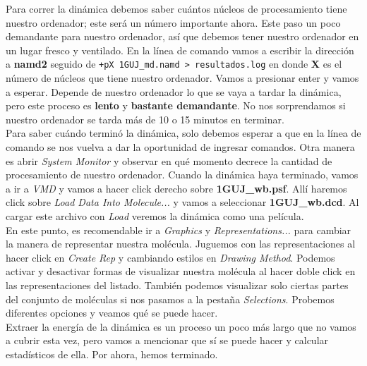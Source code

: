 \documentclass[10pt,letterpaper]{article}
\newcommand{\inlinecode}[1]{
\colorbox{light-gray}{\texttt{#1}}
}
\begin{document}
Para correr la din\'amica debemos saber cu\'antos n\'ucleos de procesamiento tiene nuestro ordenador; este ser\'a un n\'umero importante ahora. Este paso un poco demandante para nuestro ordenador, as\'i que debemos tener nuestro ordenador en un lugar fresco y ventilado. En la l\'inea de comando vamos a escribir la direcci\'on a \textbf{namd2} seguido de \inlinecode{+pX 1GUJ\_md.namd >\ resultados.log} en donde \textbf{X} es el n\'umero de n\'ucleos que tiene nuestro ordenador. Vamos a presionar enter y vamos a esperar. Depende de nuestro ordenador lo que se vaya a tardar la din\'amica, pero este proceso es \textbf{lento} y \textbf{bastante demandante}. No nos sorprendamos si nuestro ordenador se tarda m\'as de 10 o 15 minutos en terminar.\\

Para saber cu\'ando termin\'o la din\'amica, solo debemos esperar a que en la l\'inea de comando se nos vuelva a dar la oportunidad de ingresar comandos. Otra manera es abrir \textit{System Monitor} y observar en qu\'e momento decrece la cantidad de procesamiento de nuestro ordenador. Cuando la din\'amica haya terminado, vamos a ir a \textit{VMD} y vamos a hacer click derecho sobre \textbf{1GUJ\_wb.psf}. All\'i haremos click sobre \textit{Load Data Into Molecule...} y vamos a seleccionar \textbf{1GUJ\_wb.dcd}. Al cargar este archivo con \textit{Load} veremos la din\'amica como una pel\'icula.\\

En este punto, es recomendable ir a \textit{Graphics} y \textit{Representations...} para cambiar la manera de representar nuestra mol\'ecula. Juguemos con las representaciones al hacer click en \textit{Create Rep} y cambiando estilos en \textit{Drawing Method}. Podemos activar y desactivar formas de visualizar nuestra mol\'ecula al hacer doble click en las representaciones del listado. Tambi\'en podemos visualizar solo ciertas partes del conjunto de mol\'eculas si nos pasamos a la pesta\~na \textit{Selections}. Probemos diferentes opciones y veamos qu\'e se puede hacer.\\

Extraer la energ\'ia de la din\'amica es un proceso un poco m\'as largo que no vamos a cubrir esta vez, pero vamos a mencionar que s\'i se puede hacer y calcular estad\'isticos de ella. Por ahora, hemos terminado.
\end{document}
